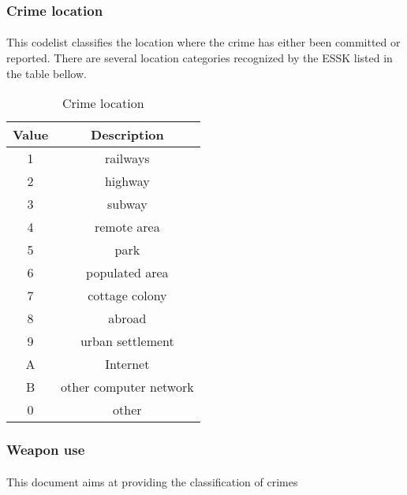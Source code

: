 \subsubsection{Crime location}
\paragraph{}
This codelist classifies the location where the crime has either been committed or reported.
There are several location categories recognized by the ESSK listed in the table bellow.

\begin{table}[!hbtp]
	\begin{tabular}{|c|c|}
		\hline
		\textbf{Value}&\textbf{Description} \\
		\hline
		1 & railways \\
		\hline
		2 & highway \\
		\hline
		3 & subway \\
		\hline
		4 & remote area \\
		\hline
		5 & park \\
		\hline
		6 & populated area \\
		\hline
		7 & cottage colony \\
		\hline
		8 & abroad \\
		\hline
		9 & urban settlement \\
		\hline
		A & Internet \\
		\hline
		B & other computer network \\
		\hline
		0 & other \\
		\hline
	\end{tabular}
	\caption{Crime location}
	\label{table:codelist_crime_location}
\end{table}

\subsubsection{Weapon use}
\paragraph{}
This document aims at providing the classification of crimes

